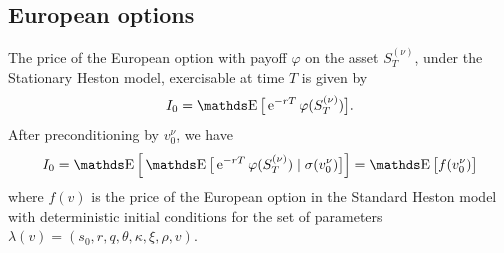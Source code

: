 \subsection{European options}

The price of the European option with payoff $\varphi$ on the asset $S_T^{(\nu)}$, under the Stationary Heston model, exercisable at time $T$ is given by
\begin{equation}
	I_0 = \E \big[ \e^{-r T} \varphi ( S_T^{(\nu)} ) \big].
\end{equation}
After preconditioning by $v_0^{\nu}$, we have
\begin{equation} \label{RH:price_stationary_heston_eu}
	I_0 = \E \Big[ \E \big[ \e^{-r T} \varphi ( S_T^{(\nu)} ) \mid \sigma(v_0^{\nu}) \big] \Big] = \E \big[ f (v_0^{\nu}) \big]
\end{equation}
where $f(v)$ is the price of the European option in the Standard Heston model with deterministic initial conditions for the set of parameters $\lambda (v) = (s_0, r, q, \theta, \kappa, \xi, \rho, v)$.

